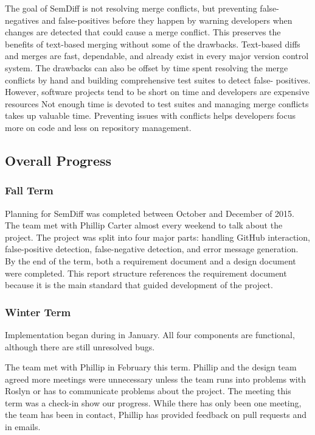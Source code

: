 \documentclass[draftclsnofoot,onecolumn]{IEEEtran}
\begin{document}
The goal of SemDiff is not resolving merge conflicts, but preventing false-
negatives and false-positives before they happen by warning developers when 
changes are detected that could cause a merge conflict. This preserves the 
benefits of text-based merging without some of the drawbacks. Text-based diffs 
and merges are fast, dependable, and already exist in every major version 
control system. The drawbacks can also be offset by time spent resolving the 
merge conflicts by hand and building comprehensive test suites to detect false-
positives. However, software projects tend to be short on time and developers 
are expensive resources Not enough time is devoted to test suites and managing 
merge conflicts takes up valuable time. Preventing issues with conflicts helps 
developers focus more on code and less on repository management.

\subsection{Overall Progress}%

\subsubsection{Fall Term}

Planning for SemDiff was completed between October and December of 2015. The 
team met with Phillip Carter almost every weekend to talk about the project. 
The project was split into four major parts: handling GitHub interaction, 
false-positive detection, false-negative detection, and error message 
generation. By the end of the term, both a requirement document and a design 
document were completed. This report structure references the requirement 
document because it is the main standard that guided development of the project.

\subsubsection{Winter Term}

Implementation began during in January. All four components are functional, 
although there are still unresolved bugs. 

The team met with Phillip in February this term. Phillip and the design team 
agreed more meetings were unnecessary unless the team runs into problems with 
Roslyn or has to communicate problems about the project. The meeting this term 
was a check-in show our progress. While there has only been one meeting, the 
team has been in contact, Phillip has provided feedback on pull requests and 
in emails.
\end{document}
